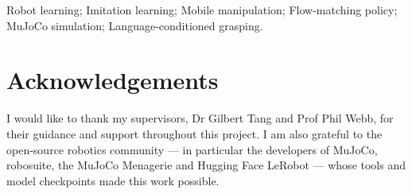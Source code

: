 \documentclass[12pt,oneside]{book}
\begin{document}
\begin{keywords}
Robot learning; Imitation learning; Mobile manipulation; Flow-matching policy;
MuJoCo simulation; Language-conditioned grasping.
\end{keywords}

\chapter{Acknowledgements}
I would like to thank my supervisors, Dr Gilbert Tang and Prof Phil Webb, for
their guidance and support throughout this project. I am also grateful to the
open-source robotics community --- in particular the developers of MuJoCo,
robosuite, the MuJoCo Menagerie and Hugging Face LeRobot --- whose tools and
model checkpoints made this work possible.

{
\clearpage
\singlespacing
{\tableofcontents}
\clearpage
\listoffigures
\clearpage
\listoftables
}

\begin{listofabbreviations}
\end{listofabbreviations}

\mainmatter
\pagestyle{fancy}
\fancyhead[L]{\nouppercase{\leftmark}}
\fancyhead[R]{\nouppercase{\rightmark}}








\printbibliography[title=References]

\appendix
\end{document}
